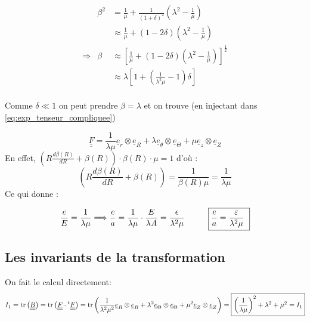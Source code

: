 \documentclass[a4paper,11pt]{article}
\newcommand{\FRAC}{\displaystyle\frac}
\begin{document}
\begin{center}
\begin{displaymath}
\begin{array}{rll}

& \beta^2 & = \FRAC{1}{\mu}+\frac{1}{\left(1+\delta\right)^2}\left(\lambda^2-\frac{1}{\mu}\right)  \\
&  & \displaystyle \approx  \frac{1}{\mu}+\left(1-2\delta\right)\left(\lambda^2-\frac{1}{\mu}\right) \\
\Rightarrow & \beta & \displaystyle \approx \left[\frac{1}{\mu} + \left(1-2\delta \right)\left(\lambda^2 -\frac{1}{\mu} \right) \right]^{\frac{1}{2}} \\
& &\displaystyle \approx \lambda\left[1+\left(\frac{1}{\lambda^2\mu}-1 \right)\delta \right]\\
\end{array}
\end{displaymath}
\end{center}

Comme $\delta \ll 1$ on peut prendre $\beta=\lambda$ et on trouve (en injectant dans \ref{eq:exp_tenseur_compliquee})

$$
\underline{\underline{F}} = \frac{1}{\lambda\mu}\underline{e}_r\otimes\underline{e}_R+\lambda\underline{e}_\theta\otimes\underline{e}_\Theta+\mu\underline{e}_z\otimes\underline{e}_Z $$
En effet, 
$\left(R \FRAC{d\beta(R)}{dR} + \beta(R)\right)\cdot \beta(R) \cdot \mu = 1$ d'où : 
$$
\left(R \frac{d\beta(R)}{dR} + \beta(R)\right) = \frac{1}{\beta(R) \mu} = \frac{1}{\lambda \mu} 
$$
Ce qui donne :

$$ \frac{e}{E} = \frac{1}{\lambda\mu} \Longrightarrow \frac{e}{a} = \frac{1}{\lambda\mu} \cdot \frac{E}{\lambda A} = \frac{ \epsilon}{\lambda^2 \mu} \hspace{1cm} \fbox{$\FRAC{e}{a} = \FRAC{\varepsilon}{\lambda^2 \mu}$ }
$$


\subsection{Les invariants de la transformation}
On fait le calcul directement: 
$$I_1=\text{tr}\left(\underline{\underline{B}}\right) = \text{tr}\left(\underline{\underline{F}}\cdot{}^{t}\underline{\underline{F}}\right) = \text{tr}\left(\frac{1}{\lambda^2\mu^2}\underline{e}_R\otimes\underline{e}_R + \lambda^2\underline{e}_\Theta\otimes\underline{e}_\Theta + \mu^2\underline{e}_Z\otimes\underline{e}_Z \right)=\fbox{$\left(\FRAC{1}{\lambda\mu}\right)^2+\lambda^2+\mu^2 = I_1$}$$
\end{document}
